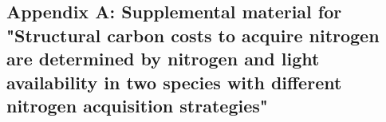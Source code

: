 \begin{singlespace}
    \chapter{\textbf{Appendix A: Supplemental material for "Structural carbon costs to acquire nitrogen are determined by nitrogen and light availability in two species with different nitrogen acquisition strategies"}}
\end{singlespace}

\setcounter{table}{0}
\renewcommand{\thetable}{A\arabic{table}}

\setcounter{figure}{0}
\renewcommand{\thefigure}{A\arabic{figure}}

\begin{table}[h!]
    \caption[Summary table containing volumes of compounds used to create modified Hoagland's solutions for each soil nitrogen fertilization treatment]{Summary table containing volumes of compounds used to create modified Hoagland's solutions for each soil nitrogen fertilization treatment. All volumes are expressed as milliliters per liter (mL/L)}
    \label{table:tab.a1}
\end{table}
